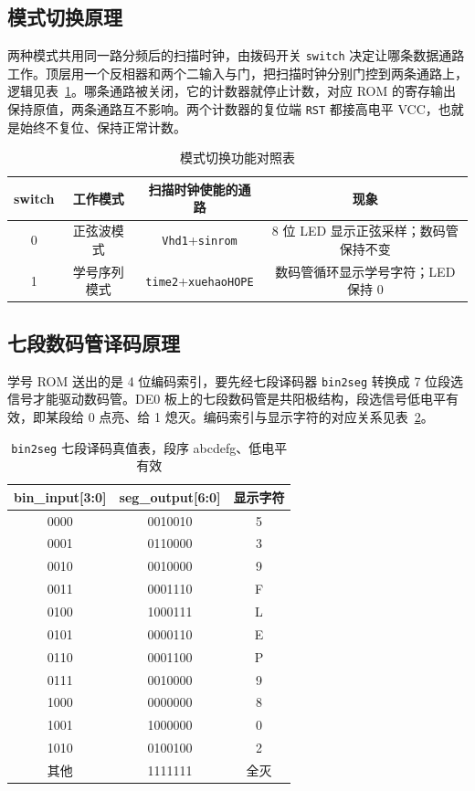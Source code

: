 \documentclass{ctexrep}
\begin{document}
\subsection{模式切换原理}

两种模式共用同一路分频后的扫描时钟，由拨码开关 \texttt{switch} 决定让哪条数据通路工作。顶层用一个反相器和两个二输入与门，把扫描时钟分别门控到两条通路上，逻辑见表~\ref{e5:tab:mode}。哪条通路被关闭，它的计数器就停止计数，对应 ROM 的寄存输出保持原值，两条通路互不影响。两个计数器的复位端 \texttt{RST} 都接高电平 VCC，也就是始终不复位、保持正常计数。

\begin{table}[H]
    \centering
    \caption{模式切换功能对照表}
    \label{e5:tab:mode}
    \begin{tabular}{cccc}
        \toprule
        \textbf{switch} & \textbf{工作模式} & \textbf{扫描时钟使能的通路} & \textbf{现象} \\
        \midrule
        0 & 正弦波模式   & \texttt{Vhd1}+\texttt{sinrom}     & 8 位 LED 显示正弦采样；数码管保持不变 \\
        1 & 学号序列模式 & \texttt{time2}+\texttt{xuehaoHOPE} & 数码管循环显示学号字符；LED 保持 0 \\
        \bottomrule
    \end{tabular}
\end{table}

\subsection{七段数码管译码原理}

学号 ROM 送出的是 4 位编码索引，要先经七段译码器 \texttt{bin2seg} 转换成 7 位段选信号才能驱动数码管。DE0 板上的七段数码管是共阳极结构，段选信号低电平有效，即某段给 0 点亮、给 1 熄灭。编码索引与显示字符的对应关系见表~\ref{e5:tab:bin2seg}。

\begin{table}[H]
    \centering
    \caption{\texttt{bin2seg} 七段译码真值表，段序 abcdefg、低电平有效}
    \label{e5:tab:bin2seg}
    \begin{tabular}{ccc}
        \toprule
        \textbf{bin\_input[3:0]} & \textbf{seg\_output[6:0]} & \textbf{显示字符} \\
        \midrule
        0000 & 0010010 & 5 \\
        0001 & 0110000 & 3 \\
        0010 & 0010000 & 9 \\
        0011 & 0001110 & F \\
        0100 & 1000111 & L \\
        0101 & 0000110 & E \\
        0110 & 0001100 & P \\
        0111 & 0010000 & 9 \\
        1000 & 0000000 & 8 \\
        1001 & 1000000 & 0 \\
        1010 & 0100100 & 2 \\
        其他 & 1111111 & 全灭 \\
        \bottomrule
    \end{tabular}
\end{table}
\end{document}
